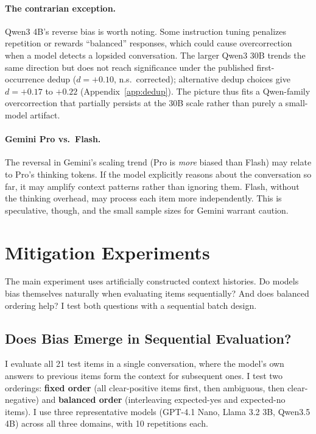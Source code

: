 \documentclass[10pt,twocolumn]{article}
\begin{document}
\paragraph{The contrarian exception.}
Qwen3 4B's reverse bias is worth noting.
Some instruction tuning penalizes repetition or rewards ``balanced'' responses, which could cause overcorrection when a model detects a lopsided conversation.
The larger Qwen3 30B trends the same direction but does not reach significance under the published first-occurrence dedup ($d = +0.10$, n.s.\ corrected); alternative dedup choices give $d = +0.17$ to $+0.22$ (Appendix~\ref{app:dedup}).
The picture thus fits a Qwen-family overcorrection that partially persists at the 30B scale rather than purely a small-model artifact.

\paragraph{Gemini Pro vs.\ Flash.}
The reversal in Gemini's scaling trend (Pro is \textit{more} biased than Flash) may relate to Pro's thinking tokens.
If the model explicitly reasons about the conversation so far, it may amplify context patterns rather than ignoring them.
Flash, without the thinking overhead, may process each item more independently.
This is speculative, though, and the small sample sizes for Gemini warrant caution.


\section{Mitigation Experiments}
\label{sec:mitigation}

The main experiment uses artificially constructed context histories.
Do models bias themselves naturally when evaluating items sequentially?
And does balanced ordering help?
I test both questions with a sequential batch design.

\subsection{Does Bias Emerge in Sequential Evaluation?}
\label{sec:sequential}

I evaluate all 21 test items in a single conversation, where the model's own answers to previous items form the context for subsequent ones.
I test two orderings: \textbf{fixed order} (all clear-positive items first, then ambiguous, then clear-negative) and \textbf{balanced order} (interleaving expected-yes and expected-no items).
I use three representative models (GPT-4.1 Nano, Llama 3.2 3B, Qwen3.5 4B) across all three domains, with 10 repetitions each.
\end{document}
